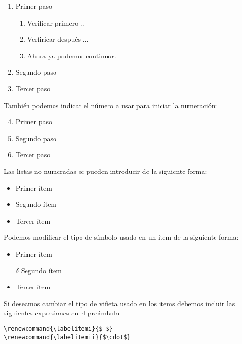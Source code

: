 \documentclass[letterpaper,12pt]{article}
\begin{document}
\begin{enumerate}
	\item Primer paso
		\begin{enumerate}
			\item Verificar primero ..
			\item Verfiricar después ...
			\item Ahora ya podemos continuar.
		\end{enumerate}
	\item Segundo paso
	\item Tercer paso
\end{enumerate}

También podemos indicar el número a usar para iniciar la numeración:

\begin{enumerate}
	\setcounter{enumi}{3}
	\item Primer paso
	\item Segundo paso
	\item Tercer paso
\end{enumerate}


Las listas no numeradas se pueden introducir de la siguiente forma: 

\begin{itemize}
	\item Primer ítem
	\item Segundo ítem
	\item Tercer ítem
\end{itemize}

Podemos modificar el tipo de símbolo usado en un item de la siguiente forma:

\begin{itemize}
	\item Primer ítem
	\item[$\delta$] Segundo ítem
	\item Tercer ítem
\end{itemize}

Si deseamos cambiar el tipo de viñeta usado en los items debemos incluir las siguientes expresiones en el preámbulo.

\begin{verbatim}
\renewcommand{\labelitemi}{$-$}
\renewcommand{\labelitemii}{$\cdot$}
\end{verbatim}
\end{document}
